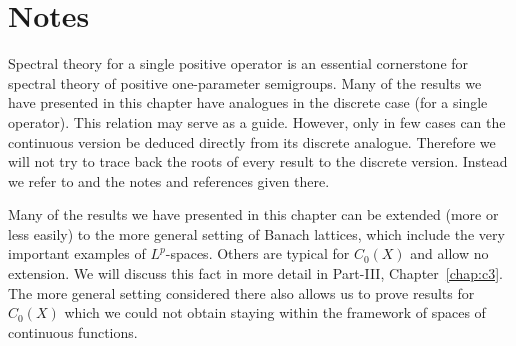 \section*{Notes}
Spectral theory for a single positive operator is an essential cornerstone for spectral theory of positive one-parameter semigroups.
Many of the results we have presented in this chapter have analogues in the discrete case (\ie for a single operator).
This relation may serve as a guide.
However, only in few cases can the continuous version be deduced directly from its discrete analogue.
Therefore we will not try to trace back the roots of every result to the discrete version.
Instead we refer to \textcite{schaefer:1974} and the notes and references given there.

Many of the results we have presented in this chapter can be extended (more or less easily) to the more general setting of Banach lattices, which include the very important examples of\/ $L^p$-spaces.
Others are typical for $C_{0}(X)$ and allow no extension.
We will discuss this fact in more detail in Part-III, Chapter~\ref{chap:c3}.
The more general setting considered there also allows us to prove results for $C_{0}(X)$ which we could not obtain staying within the framework of spaces of continuous functions.

